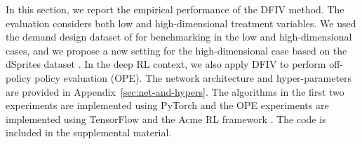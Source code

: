 In this section, we report the empirical performance of the DFIV method.  The evaluation considers both low and high-dimensional treatment variables. We used the demand design dataset of \citet{Hartford2017} for benchmarking in the low and high-dimensional cases, and we propose a new setting for the high-dimensional case based on the dSprites dataset \citep{dsprites17}. In the deep RL context, we also apply DFIV to perform off-policy policy evaluation (OPE). The network architecture and hyper-parameters are provided in Appendix~\ref{sec:net-and-hypers}. The algorithms in the first two experiments are implemented using PyTorch \citep{Pytorch} and the OPE experiments are implemented using TensorFlow \citep{abadi2016tensorflow} and the Acme RL framework \citep{hoffman2020acme}. The code is included in the supplemental material. 